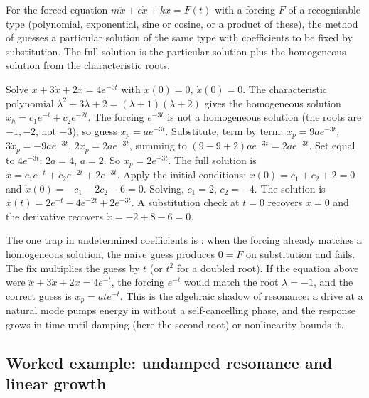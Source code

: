 For the forced equation $m\ddot{x} + c\dot{x} + kx = F(t)$ with a
forcing $F$ of a recognisable type (polynomial, exponential, sine or
cosine, or a product of these), the method of  guesses a particular solution of the same type with
coefficients to be fixed by substitution. The full solution is the
particular solution plus the homogeneous solution from the
characteristic roots.

Solve $\ddot{x} + 3\dot{x} + 2x = 4 e^{-3t}$ with $x(0) = 0$,
$\dot{x}(0) = 0$. The characteristic polynomial $\lambda^{2} +
3\lambda + 2 = (\lambda + 1)(\lambda + 2)$ gives the homogeneous
solution $x_{h} = c_{1} e^{-t} + c_{2} e^{-2t}$. The forcing
$e^{-3t}$ is not a homogeneous solution (the roots are $-1, -2$, not
$-3$), so guess $x_{p} = a e^{-3t}$. Substitute, term by term:
$\ddot{x}_{p} = 9a e^{-3t}$, $3\dot{x}_{p} = -9a e^{-3t}$,
$2x_{p} = 2a e^{-3t}$, summing to $(9 - 9 + 2) a e^{-3t} = 2a
e^{-3t}$. Set equal to $4 e^{-3t}$: $2a = 4$, $a = 2$. So
$x_{p} = 2 e^{-3t}$. The full solution is $x = c_{1} e^{-t} +
c_{2} e^{-2t} + 2 e^{-3t}$. Apply the initial conditions:
$x(0) = c_{1} + c_{2} + 2 = 0$ and $\dot{x}(0) = -c_{1} - 2c_{2} -
6 = 0$. Solving, $c_{1} = 2$, $c_{2} = -4$. The solution is
$x(t) = 2 e^{-t} - 4 e^{-2t} + 2 e^{-3t}$. A substitution check at
$t = 0$ recovers $x = 0$ and the derivative recovers
$\dot{x} = -2 + 8 - 6 = 0$.

The one trap in undetermined coefficients is : when the forcing already matches a homogeneous solution,
the naive guess produces $0 = F$ on substitution and fails. The fix
multiplies the guess by $t$ (or $t^{2}$ for a doubled root). If the
equation above were $\ddot{x} + 3\dot{x} + 2x = 4 e^{-t}$, the
forcing $e^{-t}$ would match the root $\lambda = -1$, and the correct
guess is $x_{p} = a t e^{-t}$. This is the algebraic shadow of
resonance: a drive at a natural mode pumps energy in without a
self-cancelling phase, and the response grows in time until damping
(here the second root) or nonlinearity bounds it.

\subsection{Worked example: undamped resonance and linear growth}

